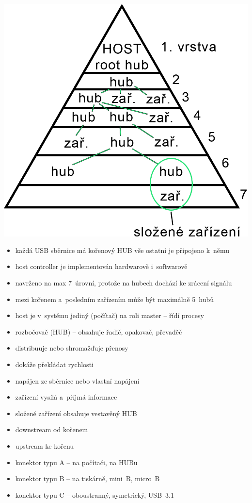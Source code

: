 \documentclass[a4paper,12pt]{article}
\providecommand{\tightlist}{%
\setlength{\itemsep}{0pt}\setlength{\parskip}{0pt}}
\begin{document}
\includegraphics{ref/usb-structure.png}

\begin{itemize}
  \tightlist
  \item každá USB sběrnice má kořenový HUB vše ostatní je připojeno k~němu 
  \item host controller je implementován hardwarově i~softwarově
  \item navrženo na max 7~úrovní, protože na hubech dochází ke zrácení signálu
  \item mezi kořenem a~posledním zařízením může být maximálně 5~hubů
  \item host je v~systému jediný (počítač) na roli master -- řídí procesy
  \item rozbočovač (HUB) -- obsahuje řadič, opakovač, převaděč
  \item distribuuje nebo shromažďuje přenosy
  \item dokáže překládat rychlosti
  \item napájen ze sběrnice nebo vlastní napájení
  \item zařízení vysílá a~příjmá informace 
  \item složené zařízení obsahuje vestavěný HUB
  \item downstream od kořenem
  \item upstream ke kořenu
  \item konektor typu A -- na počítači, na HUBu
  \item konektor typu B -- na tiskárně, mini~B, micro~B
  \item konektor typu C -- oboustranný, symetrický, USB~3.1
\end{itemize}
\end{document}
